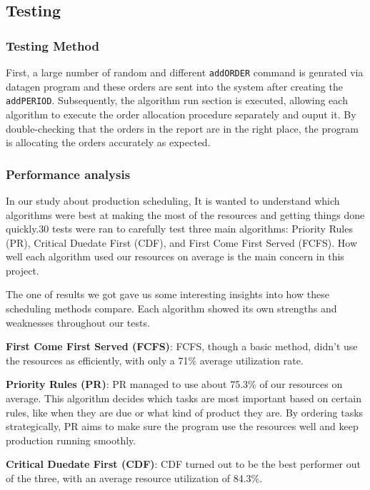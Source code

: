 \documentclass{ieeeaccess}
\begin{document}
\subsection{Testing}
\subsubsection{Testing Method}
First, a large number of random and different \texttt{addORDER} command is genrated via datagen program and these orders are sent into the system after creating the \texttt{addPERIOD}. Subsequently, the algorithm run section is executed, allowing each algorithm to execute the order allocation procedure separately and ouput it. By double-checking that the orders in the report are in the right place, the program is allocating the orders accurately as expected.

\subsubsection{Performance analysis}
In our study about production scheduling, It is wanted to understand which algorithms were best at making the most of the resources and getting things done quickly.30 tests were ran to carefully test three main algorithms: Priority Rules (PR), Critical Duedate First (CDF), and First Come First Served (FCFS). How well each algorithm used our resources on average is the main concern in this project.

The one of results we got gave us some interesting insights into how these scheduling methods compare. Each algorithm showed its own strengths and weaknesses throughout our tests.

\textbf{First Come First Served (FCFS)}: FCFS, though a basic method, didn't use the resources as efficiently, with only a 71\% average utilization rate.

\textbf{Priority Rules (PR)}: PR managed to use about 75.3\% of our resources on average. This algorithm decides which tasks are most important based on certain rules, like when they are due or what kind of product they are. By ordering tasks strategically, PR aims to make sure the program use the resources well and keep production running smoothly.

\textbf{Critical Duedate First (CDF)}: CDF turned out to be the best performer out of the three, with an average resource utilization of 84.3\%.
\end{document}
